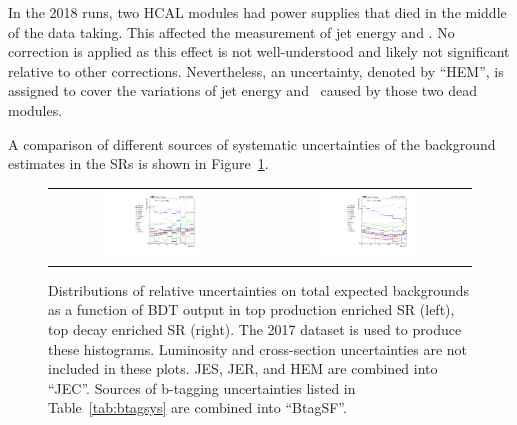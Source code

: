 In the 2018 runs, two \ac{HCAL} modules had power supplies that died in the middle of the data taking. This affected the measurement of jet energy and \MET. No correction is applied as this effect is not well-understood and likely not significant relative to other corrections. Nevertheless, an uncertainty, denoted by ``HEM'', is assigned to cover the variations of jet energy and \MET~caused by those two dead modules. 

A comparison of different sources of systematic uncertainties of the background estimates in the \acp{SR} is shown in Figure~\ref{fig:Comp_sys_background}.

\begin{figure}[tbh!]
 \begin{center}
 \begin{tabular}{cc}
 \includegraphics[width=0.48\textwidth]{figures/Part3/Systematics/sysBDT_ST_bkg_2017}&
 \includegraphics[width=0.48\textwidth]{figures/Part3/Systematics/sysBDT_TT_bkg_2017} \\
 \end{tabular}
 \caption{Distributions of relative uncertainties on total expected backgrounds as a function of \ac{BDT} output in top production enriched \ac{SR} (left), top decay enriched \ac{SR} (right). The 2017 dataset is used to produce these histograms. Luminosity and cross-section uncertainties are not included in these plots. \ac{JES}, \ac{JER}, and HEM are combined into ``JEC''. Sources of b-tagging uncertainties listed in Table~\ref{tab:btagsys} are combined into ``BtagSF''.}
 \label{fig:Comp_sys_background}
 \end{center}
\end{figure}

